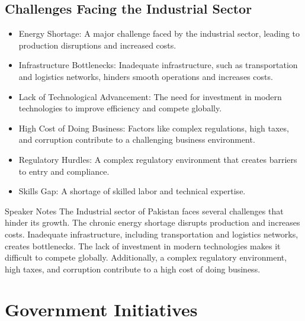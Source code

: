 \documentclass[
  letterpaper,
  DIV=11,
  numbers=noendperiod]{scrartcl}
\begin{document}
\subsection{Challenges Facing the Industrial
Sector}\label{challenges-facing-the-industrial-sector}

\begin{itemize}
\item
  Energy Shortage: A major challenge faced by the industrial sector,
  leading to production disruptions and increased costs.
\item
  Infrastructure Bottlenecks: Inadequate infrastructure, such as
  transportation and logistics networks, hinders smooth operations and
  increases costs.
\item
  Lack of Technological Advancement: The need for investment in modern
  technologies to improve efficiency and compete globally.
\item
  High Cost of Doing Business: Factors like complex regulations, high
  taxes, and corruption contribute to a challenging business
  environment.
\item
  Regulatory Hurdles: A complex regulatory environment that creates
  barriers to entry and compliance.
\item
  Skills Gap: A shortage of skilled labor and technical expertise.
\end{itemize}

Speaker Notes The Industrial sector of Pakistan faces several challenges
that hinder its growth. The chronic energy shortage disrupts production
and increases costs. Inadequate infrastructure, including transportation
and logistics networks, creates bottlenecks. The lack of investment in
modern technologies makes it difficult to compete globally.
Additionally, a complex regulatory environment, high taxes, and
corruption contribute to a high cost of doing business.

\section{Government Initiatives}\label{government-initiatives}
\end{document}

